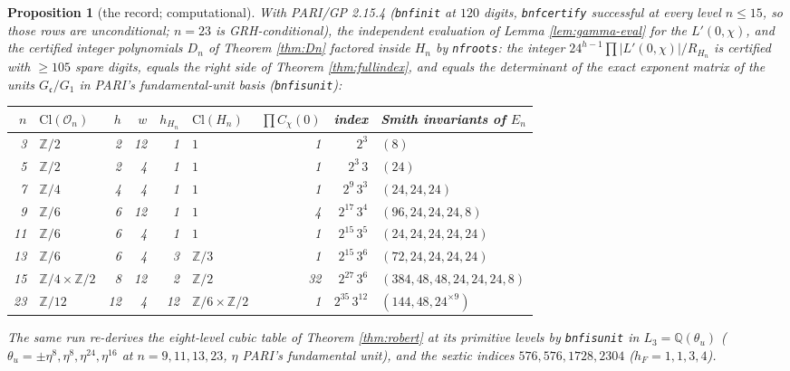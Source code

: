 \documentclass[11pt]{amsart}
\numberwithin{equation}{section}
\theoremstyle{plain}
\newtheorem{proposition}[theorem]{Proposition}
\theoremstyle{definition}
\theoremstyle{remark}
\newcommand{\Q}{\mathbb{Q}}
\newcommand{\Z}{\mathbb{Z}}
\newcommand{\Cl}{\mathrm{Cl}}
\newcommand{\idealc}{\mathfrak{c}}
\newcommand{\Oc}{\mathcal{O}}
\begin{document}
\begin{proposition}[the record; computational]\label{prop:fullrecord}
With PARI/GP 2.15.4 \cite{PARI} (\texttt{bnfinit} at $120$ digits, \texttt{bnfcertify}
successful at every level $n \le 15$, so those rows are unconditional;
$n = 23$ is GRH-conditional), the independent evaluation of Lemma
\ref{lem:gamma-eval} for the $L'(0,\chi)$, and the certified integer
polynomials $D_n$ of Theorem \ref{thm:Dn} factored inside $H_n$ by
\texttt{nfroots}: the integer $24^{h-1}\prod|L'(0,\chi)|/R_{H_n}$ is
certified with $\ge 105$ spare digits, equals the right side of Theorem
\ref{thm:fullindex}, and equals the determinant of the exact exponent
matrix of the units $G_\idealc/G_1$ in PARI's fundamental-unit basis
(\texttt{bnfisunit}):
\begin{center}
\footnotesize
\setlength{\tabcolsep}{4pt}
\begin{tabular}{@{}rlrrrlrrl@{}}
\toprule
$n$ & $\Cl(\Oc_n)$ & $h$ & $w$ & $h_{H_n}$ & $\Cl(H_n)$ & $\prod C_\chi(0)$ & index & Smith invariants of $E_n$\\
\midrule
3 & $\Z/2$ & 2 & 12 & 1 & $1$ & 1 & $2^3$ & $(8)$\\
5 & $\Z/2$ & 2 & 4 & 1 & $1$ & 1 & $2^3\,3$ & $(24)$\\
7 & $\Z/4$ & 4 & 4 & 1 & $1$ & 1 & $2^9\,3^3$ & $(24,24,24)$\\
9 & $\Z/6$ & 6 & 12 & 1 & $1$ & 4 & $2^{17}\,3^4$ & $(96,24,24,24,8)$\\
11 & $\Z/6$ & 6 & 4 & 1 & $1$ & 1 & $2^{15}\,3^5$ & $(24,24,24,24,24)$\\
13 & $\Z/6$ & 6 & 4 & 3 & $\Z/3$ & 1 & $2^{15}\,3^6$ & $(72,24,24,24,24)$\\
15 & $\Z/4\times\Z/2$ & 8 & 12 & 2 & $\Z/2$ & 32 & $2^{27}\,3^6$ & $(384,48,48,24,24,24,8)$\\
23 & $\Z/12$ & 12 & 4 & 12 & $\Z/6\times\Z/2$ & 1 & $2^{35}\,3^{12}$ & $(144,48,24^{\times9})$\\
\bottomrule
\end{tabular}
\end{center}
The same run re-derives the eight-level cubic table of Theorem
\ref{thm:robert} at its primitive levels by \texttt{bnfisunit} in
$L_3 = \Q(\theta_u)$ ($\theta_u = \pm\eta^{8}, \eta^{8}, \eta^{24}, \eta^{16}$
at $n = 9, 11, 13, 23$, $\eta$ PARI's fundamental unit), and the sextic
indices $576, 576, 1728, 2304$ ($h_F = 1, 1, 3, 4$).
\end{proposition}
\end{document}
